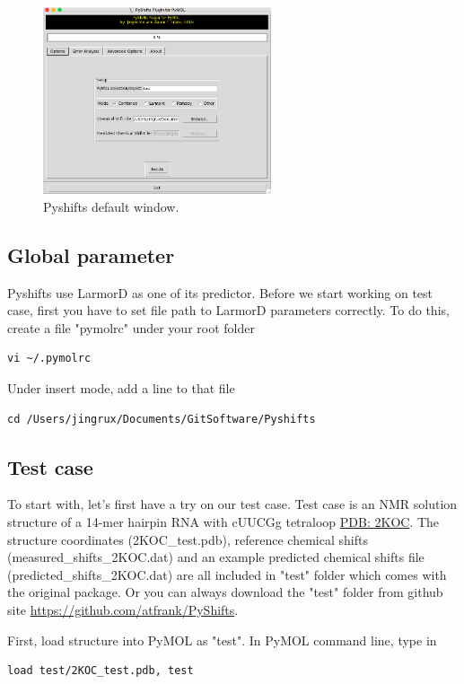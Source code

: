 \documentclass{article}
\begin{document}
\begin{figure}[htbp]
\centering
\includegraphics[width=0.6\textwidth]{main}
\caption{Pyshifts default window.}
\label{fig:layout1}
\end{figure}



\subsection{Global parameter}
Pyshifts use LarmorD as one of its predictor. Before we start working on test case, first you have to set file path to LarmorD parameters correctly. To do this, create a file "pymolrc" under your root folder
\begin{lstlisting}
vi ~/.pymolrc
\end{lstlisting}
Under insert mode, add a line to that file
\begin{lstlisting}
cd /Users/jingrux/Documents/GitSoftware/Pyshifts
\end{lstlisting}


\subsection{Test case}
To start with, let's first have a try on our test case. Test case is an NMR solution structure of a 14-mer hairpin RNA with cUUCGg tetraloop \href{http://www.rcsb.org/pdb/explore.do?structureId=2koc}{PDB: 2KOC}. The structure coordinates (2KOC\_test.pdb), reference chemical shifts (measured\_shifts\_2KOC.dat) and an example predicted chemical shifts file (predicted\_shifts\_2KOC.dat) are all included in "test" folder which comes with the original package. Or you can always download the "test" folder from github site \url{https://github.com/atfrank/PyShifts}.

First, load structure into PyMOL as "test". In PyMOL command line, type in
\begin{lstlisting}
load test/2KOC_test.pdb, test
\end{lstlisting}
\end{document}
